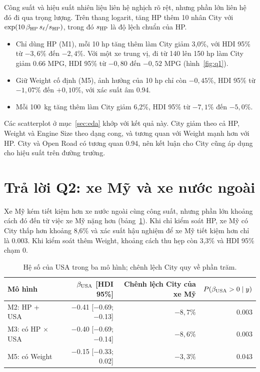 \documentclass[12pt,a4paper]{report}
\begin{document}
Công suất và hiệu suất nhiên liệu liên hệ nghịch rõ rệt, nhưng phần lớn liên hệ
đó đi qua trọng lượng. Trên thang logarit, tăng HP thêm 10 nhân City với
$\exp(10\, \beta_{\mathrm{HP}}\, s_\ell / s_{\mathrm{HP}})$, trong đó $s_{\mathrm{HP}}$ là độ lệch chuẩn
của HP.

\begin{itemize}
  \item Chỉ dùng HP (M1), mỗi 10 hp tăng thêm làm City giảm 3{,}0\%, với HDI 95\%
    từ $-3{,}6\%$ đến $-2{,}4\%$. Với một xe trung vị, đi từ 140 lên 150 hp làm
    City giảm \num{0.66} MPG, HDI 95\% từ $-0{,}80$ đến $-0{,}52$ MPG
    (hình~\ref{fig:q1}).
  \item Giữ Weight cố định (M5), ảnh hưởng của 10 hp chỉ còn $-0{,}45\%$, HDI
    95\% từ $-1{,}07\%$ đến $+0{,}10\%$, với xác suất âm \num{0.94}.
  \item Mỗi \SI{100}{kg} tăng thêm làm City giảm 6{,}2\%, HDI 95\% từ $-7{,}1\%$
    đến $-5{,}0\%$.
\end{itemize}

Các scatterplot ở mục~\ref{sec:eda} khớp với kết quả này. City giảm theo cả HP,
Weight và Engine Size theo dạng cong, và tương quan với Weight mạnh hơn với HP.
City và Open Road có tương quan \num{0.94}, nên kết luận cho City cũng áp dụng
cho hiệu suất trên đường trường.


\section{Trả lời Q2: xe Mỹ và xe nước ngoài}
\label{sec:q2}

Xe Mỹ kém tiết kiệm hơn xe nước ngoài cùng công suất, nhưng phần lớn khoảng cách
đó đến từ việc xe Mỹ nặng hơn (bảng~\ref{tab:q2}). Khi chỉ kiểm soát HP, xe Mỹ
có City thấp hơn khoảng 8{,}6\% và xác suất hậu nghiệm để xe Mỹ tiết kiệm hơn chỉ
là \num{0.003}. Khi kiểm soát thêm Weight, khoảng cách thu hẹp còn 3{,}3\% và
HDI 95\% chạm 0.

\begin{table}[tp]
  \centering
  \caption{Hệ số của USA trong ba mô hình; chênh lệch City quy về phần trăm.}
  \label{tab:q2}
  \begin{tabular}{lrrr}
    \toprule
    Mô hình & $\beta_{\mathrm{USA}}$ [HDI 95\%] & Chênh lệch City của xe Mỹ & $P(\beta_{\mathrm{USA}} > 0 \mid y)$ \\
    \midrule
    M2: HP + USA         & \num{-0.41} [\num{-0.69}; \num{-0.13}] & $-8{,}7\%$ & \num{0.003} \\
    M3: có HP $\times$ USA & \num{-0.40} [\num{-0.69}; \num{-0.14}] & $-8{,}6\%$ & \num{0.003} \\
    M5: có Weight        & \num{-0.15} [\num{-0.33}; \num{0.02}]  & $-3{,}3\%$ & \num{0.043} \\
    \bottomrule
  \end{tabular}
\end{table}
\end{document}
